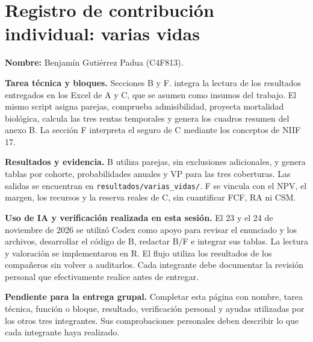\section*{Registro de contribución individual: varias vidas}

\textbf{Nombre:} Benjamín Gutiérrez Padua (C4F813).

\textbf{Tarea técnica y bloques.} Secciones B y F.
 integra la lectura de los resultados entregados
en los Excel de A y C, que se asumen como insumos del trabajo.
El mismo script asigna parejas, comprueba admisibilidad,
proyecta mortalidad biológica, calcula las tres rentas temporales
y genera los cuadros resumen del anexo B.
La sección F interpreta el seguro de C mediante los conceptos de NIIF 17.

\textbf{Resultados y evidencia.} B utiliza \NParejasB{} parejas, sin exclusiones
adicionales, y genera tablas por cohorte, probabilidades anuales y VP para
las tres coberturas. Las salidas se encuentran en
\texttt{resultados/varias\_vidas/}. F se vincula con el NPV, el margen,
los recursos y la reserva reales de C, sin cuantificar FCF, RA ni CSM.

\textbf{Uso de IA y verificación realizada en esta sesión.}
El 23 y el 24 de noviembre de 2026 se utilizó Codex como apoyo para revisar el
enunciado y los archivos, desarrollar el código de B, redactar B/F e
integrar sus tablas. La lectura y valoración se implementaron en R.
El flujo utiliza los resultados de los compañeros sin volver a auditarlos.
Cada integrante debe documentar
la revisión personal que efectivamente realice antes de entregar.

\textbf{Pendiente para la entrega grupal.} Completar esta página con nombre,
tarea técnica, función o bloque, resultado, verificación personal y ayudas
utilizadas por los otros tres integrantes. Sus comprobaciones personales
deben describir lo que cada integrante haya realizado.
